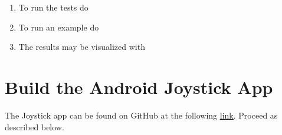 \begin{enumerate}
	\item To run the tests do
	\newline {}
	\newline {}
	\item To run an example do
	\newline {}
	\newline {}
	\item The results may be visualized with
	\newline {}
	\newline {}
\end{enumerate}
\FloatBarrier
\section{Build the Android Joystick App}
\label{sec::A2_aa}
The Joystick app can be found on GitHub at the following \href{https://github.com/mhubii/ijoy}{\underline{link}}. Proceed as described below.
